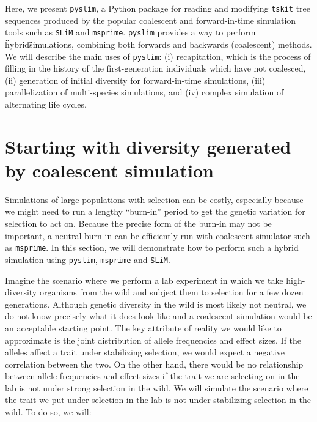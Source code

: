 \documentclass[12pt]{article}
\newcommand{\msprime}[0]{\texttt{msprime}\xspace}
\newcommand{\tskit}[0]{\texttt{tskit}\xspace}
\newcommand{\slim}[0]{\texttt{SLiM}\xspace}
\newcommand{\pyslim}[0]{\texttt{pyslim}\xspace}
\begin{document}
Here, we present \pyslim, a Python package for reading and modifying \tskit tree sequences produced by
the popular coalescent and forward-in-time simulation tools such as \slim and \msprime.
\pyslim provides a way to perform \"hybrid\" simulations, combining both forwards and backwards (coalescent) methods.
We will describe the main uses of \pyslim: (i) recapitation, which is the process of filling in the history of the first-generation individuals which have not coalesced, (ii) generation of initial diversity for forward-in-time simulations, (iii) parallelization of multi-species simulations, and (iv) complex simulation of alternating life cycles.

\section*{Starting with diversity generated by coalescent simulation}

Simulations of large populations with selection can be costly,
especially because we might need to run a lengthy “burn-in” period to get the genetic variation for selection to act on.
Because the precise form of the burn-in may not be important, 
a neutral burn-in can be efficiently run with coalescent simulator such as \msprime.
In this section, we will demonstrate how to perform such a hybrid simulation using \pyslim, \msprime and \slim.

Imagine the scenario where we perform a lab experiment in which
we take high-diversity organisms from the wild and subject them to selection for a few dozen generations.
Although genetic diversity in the wild is most likely not neutral,
we do not know precisely what it does look like and a coalescent simulation would be an acceptable starting point.
The key attribute of reality we would like to approximate is the joint distribution of allele frequencies and effect sizes.
If the alleles affect a trait under stabilizing selection,
we would expect a negative correlation between the two.
On the other hand, there would be no relationship between allele frequencies and effect sizes
if the trait we are selecting on in the lab is not under strong selection in the wild.
We will simulate the scenario where the trait we put under selection in the lab is not under stabilizing selection in the wild.
To do so, we will:
\end{document}
